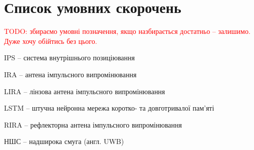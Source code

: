 \section*{Список умовних скорочень}


\textcolor{red}{TODO: збираємо умовні позначення, якщо назбирається 
достатньо -- залишимо. Дуже хочу обійтись без цього.}

IPS -- система внутрішнього позиціювання

IRA -- антена імпульсного випромінювання

LIRA -- лінзова антена імпульсного випромінювання

LSTM -- штучна нейронна мережа коротко- та довготривалої пам'яті

RIRA -- рефлекторна антена імпульсного випромінювання

НШС -- надширока смуга (англ. UWB)
